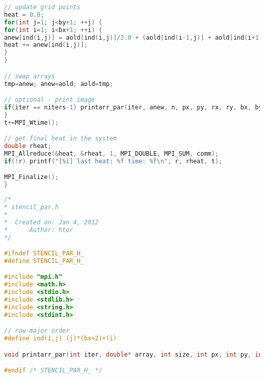 \begin{lstlisting}[language=C, label={lst_stencpara}, caption={stencil\_mpi.c.}]
// update grid points
heat = 0.0;
for(int j=1; j<by+1; ++j) {
for(int i=1; i<bx+1; ++i) {
anew[ind(i,j)] = aold[ind(i,j)]/2.0 + (aold[ind(i-1,j)] + aold[ind(i+1,j)] + aold[ind(i,j-1)] + aold[ind(i,j+1)])/4.0/2.0;
heat += anew[ind(i,j)];
}
}

// swap arrays
tmp=anew; anew=aold; aold=tmp;

// optional - print image
if(iter == niters-1) printarr_par(iter, anew, n, px, py, rx, ry, bx, by, offx, offy, comm);
}
t+=MPI_Wtime();

// get final heat in the system
double rheat;
MPI_Allreduce(&heat, &rheat, 1, MPI_DOUBLE, MPI_SUM, comm);
if(!r) printf("[%i] last heat: %f time: %f\n", r, rheat, t);

MPI_Finalize();
}
\end{lstlisting}


\begin{lstlisting}[language=C, label={lst_stencparainc}, caption={stencil\_par.h.}]
/*
* stencil_par.h
*
*  Created on: Jan 4, 2012
*      Author: htor
*/

#ifndef STENCIL_PAR_H_
#define STENCIL_PAR_H_

#include "mpi.h"
#include <math.h>
#include <stdio.h>
#include <stdlib.h>
#include <string.h>
#include <stdint.h>

// row-major order
#define ind(i,j) (j)*(bx+2)+(i)

void printarr_par(int iter, double* array, int size, int px, int py, int rx, int ry, int bx, int by, int offx, int offy, MPI_Comm comm);

#endif /* STENCIL_PAR_H_ */

\end{lstlisting}

